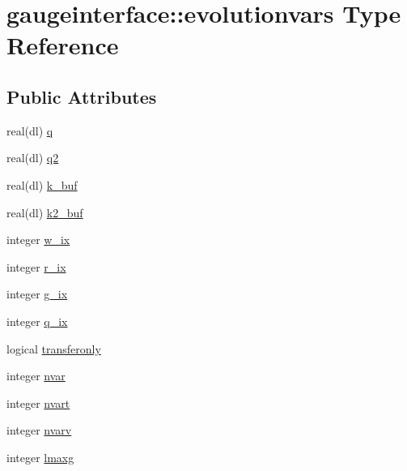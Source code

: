\hypertarget{structgaugeinterface_1_1evolutionvars}{}\section{gaugeinterface\+:\+:evolutionvars Type Reference}
\label{structgaugeinterface_1_1evolutionvars}
\subsection*{Public Attributes}
\begin{DoxyCompactItemize}
\item 
real(dl) \mbox{\hyperlink{structgaugeinterface_1_1evolutionvars_a95540aecca15dc4edbc5f029f8642e74}{q}}
\item 
real(dl) \mbox{\hyperlink{structgaugeinterface_1_1evolutionvars_af620d0d21f3d2a299b09f6e82adeb178}{q2}}
\item 
real(dl) \mbox{\hyperlink{structgaugeinterface_1_1evolutionvars_af9c32581915121e6ed1152cf9478fef8}{k\+\_\+buf}}
\item 
real(dl) \mbox{\hyperlink{structgaugeinterface_1_1evolutionvars_a2f4fa47a492bf58f63f6522ce1bbc9cb}{k2\+\_\+buf}}
\item 
integer \mbox{\hyperlink{structgaugeinterface_1_1evolutionvars_afb5b2fa1570ab87abbf977febcb66d6b}{w\+\_\+ix}}
\item 
integer \mbox{\hyperlink{structgaugeinterface_1_1evolutionvars_aa286f5f537b1eb63318022e755eb8a9e}{r\+\_\+ix}}
\item 
integer \mbox{\hyperlink{structgaugeinterface_1_1evolutionvars_a9dad19894c6d24e331e88ee885861aaa}{g\+\_\+ix}}
\item 
integer \mbox{\hyperlink{structgaugeinterface_1_1evolutionvars_a40dfce121d83585904028ea3a18ddeee}{q\+\_\+ix}}
\item 
logical \mbox{\hyperlink{structgaugeinterface_1_1evolutionvars_a0221c6b5ef19af720fbbc738c2441dc7}{transferonly}}
\item 
integer \mbox{\hyperlink{structgaugeinterface_1_1evolutionvars_acc6b6dff618567e33dca873b922620a2}{nvar}}
\item 
integer \mbox{\hyperlink{structgaugeinterface_1_1evolutionvars_ad98f4b14e81b00d91c2d7a61b4a6af8b}{nvart}}
\item 
integer \mbox{\hyperlink{structgaugeinterface_1_1evolutionvars_ac9bc05a57bd84400544cf712c64d2599}{nvarv}}
\item 
integer \mbox{\hyperlink{structgaugeinterface_1_1evolutionvars_a6ea08e1b3c0ca0f9df4f49bd5dd0d436}{lmaxg}}

\end{DoxyCompactItemize}
